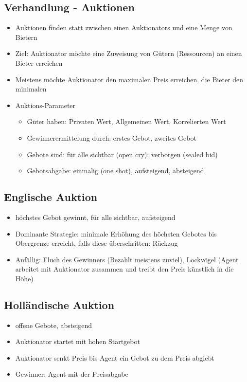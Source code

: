 \documentclass{article} %
\begin{document}
	\subsection{Verhandlung - Auktionen}
	\begin{itemize}
		\item Auktionen finden statt zwischen einen Auktionators und eine Menge von Bietern 
		\item Ziel: Auktionator möchte eine Zuweisung von Gütern (Ressourcen) an einen Bieter erreichen
		\item Meistens möchte Auktionator den maximalen Preis erreichen, die Bieter den minimalen
		\item Auktions-Parameter
		\begin{itemize}
			\item Güter haben: Privaten Wert, Allgemeinen Wert, Korrelierten Wert
			\item Gewinnerermittelung durch: erstes Gebot, zweites Gebot
			\item Gebote sind: für alle sichtbar (open cry); verborgen (sealed bid)
			\item Gebotsabgabe: einmalig (one shot), aufsteigend, absteigend
		\end{itemize}
	\end{itemize}
	\subsection{Englische Auktion}
	\begin{itemize}
		\item höchstes Gebot gewinnt, für alle sichtbar, aufsteigend
		\item Dominante Strategie: minimale Erhöhung des höchsten Gebotes bis Obergrenze erreicht, falls diese überschritten: Rückzug
		\item Anfällig: Fluch des Gewinners (Bezahlt meistens zuviel), Lockvögel (Agent arbeitet mit Auktionator zusammen und treibt den Preis künstlich in die Höhe)
	\end{itemize}
	\subsection{Holländische Auktion}
	\begin{itemize}
		\item offene Gebote, absteigend
		\item Auktionator startet mit hohen Startgebot
		\item Auktionator senkt Preis bis Agent ein Gebot zu dem Preis abgiebt
		\item Gewinner: Agent mit der Preisabgabe
	\end{itemize}
\end{document}
